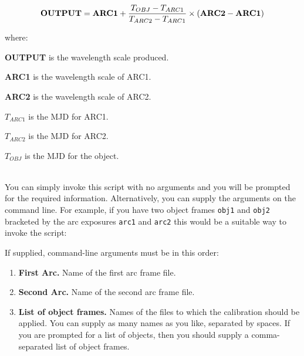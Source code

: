 \documentclass[twoside,11pt]{starlink}
\begin{document}
\begin{description}
\begin{displaymath}
   {\bf{OUTPUT}} = {\bf{ARC1}} + \frac{T_{OBJ} - T_{ARC1}}
                   {T_{ARC2} - T_{ARC1}} \times
                   ({\bf{ARC2}} - {\bf{ARC1}})
\end{displaymath}

     where:

\begin{description}

\item \textbf{OUTPUT} is the wavelength scale produced.
\item \textbf{ARC1}   is the wavelength scale of ARC1.
\item \textbf{ARC2}   is the wavelength scale of ARC2.
\item $T_{ARC1}$  is the MJD for ARC1.
\item $T_{ARC2}$  is the MJD for ARC2.
\item $T_{OBJ}$   is the MJD for the object.

\end{description}

\item [\textbf{Usage:}] \mbox{} \\
     You can simply invoke this script with no arguments and you
     will be prompted for the required information.  Alternatively,
     you can supply the arguments on the command line.  For example,
     if you have two object frames \verb+obj1+ and \verb+obj2+ bracketed
     by the arc exposures \verb+arc1+ and \verb+arc2+ this would be a
     suitable way to invoke the script:

\begin{terminalv}
\end{terminalv}

     If supplied, command-line arguments must be in this order:

\begin{enumerate}

\item \textbf{First Arc.}
      Name of the first arc frame file.

\item \textbf{Second Arc.}
      Name of the second arc frame file.

\item \textbf{List of object frames.}
      Names of the files to which the calibration should be applied.
      You can supply as many names as you like, separated by spaces.
      If you are prompted for a list of objects, then you should
      supply a comma-separated list of object frames.


\end{enumerate}
\end{description}
\end{document}
